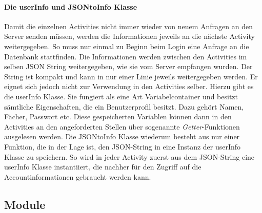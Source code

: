 \documentclass[a4paper,11pt]{report}
\begin{document}
				\paragraph{Die userInfo und JSONtoInfo Klasse}
				Damit die einzelnen Activities nicht immer wieder von neuem Anfragen an den Server senden müssen, werden die Informationen jeweils an die nächste Activity weitergegeben. So muss nur einmal zu Beginn beim Login eine Anfrage an die Datenbank stattfinden. Die Informationen werden zwischen den Activities im selben JSON String weitergegeben, wie sie vom Server empfangen wurden. Der String ist kompakt und kann in nur einer Linie jeweils weitergegeben werden. Er eignet sich jedoch nicht zur Verwendung in den Activities selber. Hierzu gibt es die userInfo Klasse. Sie fungiert als eine Art \glqq Variabelcontainer\grqq{} und besitzt sämtliche Eigenschaften, die ein Benutzerprofil besitzt. Dazu gehört Namen, Fächer, Passwort etc. Diese gespeicherten Variablen können dann in den Activities an den angeforderten Stellen über sogenannte \emph{Getter}-Funktionen ausgelesen werden. Die JSONtoInfo Klasse wiederum besteht aus nur einer Funktion, die in der Lage ist, den JSON-String in eine Instanz der userInfo Klasse zu speichern. So wird in jeder Activity zuerst aus dem JSON-String eine userInfo Klasse instantiiert, die nachher für den Zugriff auf die Accountinformationen gebraucht werden kann.
			
			\subsection{Module}
			
\end{document}
